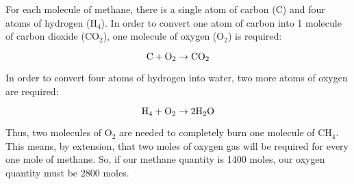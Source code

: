 
For each molecule of methane, there is a single atom of carbon (C) and four atoms of hydrogen (H$_{4}$).  In order to convert one atom of carbon into 1 molecule of carbon dioxide (CO$_{2}$), one molecule of oxygen (O$_{2}$) is required:

$$\hbox{C} + \hbox{O}_2 \to \hbox{CO}_2$$

In order to convert four atoms of hydrogen into water, two more atoms of oxygen are required:

$$\hbox{H}_4 + \hbox{O}_2 \to 2\hbox{H}_2\hbox{O}$$

Thus, two molecules of O$_{2}$ are needed to completely burn one molecule of CH$_{4}$.  This means, by extension, that two moles of oxygen gas will be required for every one mole of methane.  So, if our methane quantity is 1400 moles, our oxygen quantity must be 2800 moles.











